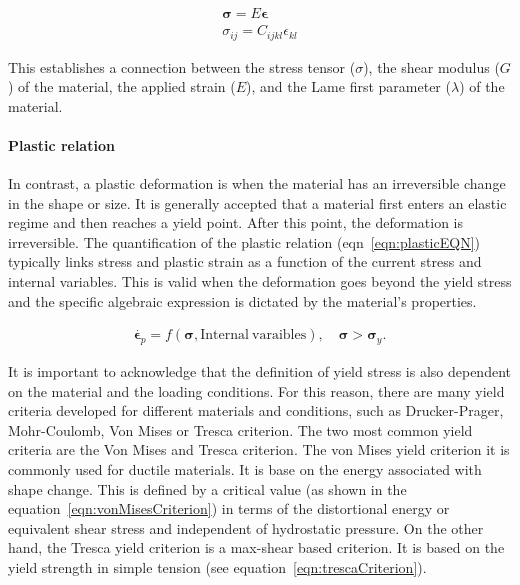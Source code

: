 \begin{gather}
    \bm{\sigma} = E\bm{\epsilon}\label{eqn:elasticEQN} \\
    \sigma_{ij} = C_{ijkl}\epsilon_{kl}
\end{gather}

This establishes a connection between the stress tensor ($\sigma$), the shear modulus ($G$) of the material, the applied strain ($E$), and the Lame first parameter ($\lambda$) of the material\citep{bonyadiReviewFrictionLubrication2020}.

\paragraph{Plastic relation} In contrast, a plastic deformation is when the material has an irreversible change in the shape or size.
It is generally accepted that a material first enters an elastic regime and then reaches a yield point. 
After this point, the deformation is irreversible.
The quantification of the plastic relation (eqn~\eqref{eqn:plasticEQN}) typically links stress and plastic strain as a function of the current stress and internal variables.
This is valid when the deformation goes beyond the yield stress and the specific algebraic expression is dictated by the material's properties.

\begin{gather}
    \dot{\bm{\epsilon}_{p}} = f\left(\bm{\sigma},\mathrm{Internal~varaibles}\right),\quad\bm{\sigma}>\bm{\sigma}_{y}\label{eqn:plasticEQN}.
\end{gather}

It is important to acknowledge that the definition of yield stress\citep{bonnYieldStressMaterials2017} is also dependent on the material and the loading conditions.
For this reason, there are many yield criteria developed for different materials and conditions, such as Drucker-Prager, Mohr-Coulomb, Von Mises or Tresca criterion.
The two most common yield criteria are the Von Mises and Tresca criterion.
The von Mises yield criterion it is commonly used for ductile materials.
It is base on the energy associated with shape change. 
This is defined by a critical value (as shown in the equation~\eqref{eqn:vonMisesCriterion}) in terms of the distortional energy or equivalent shear stress and independent of hydrostatic pressure. 
On the other hand, the Tresca yield criterion is a max-shear based criterion.
It is based on the yield strength in simple tension (see equation~\eqref{eqn:trescaCriterion}).

